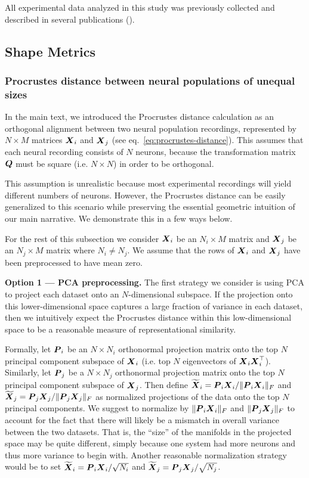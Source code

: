 
All experimental data analyzed in this study was previously collected and described in several publications (\cite{duszkiewicz,Siegle2021-hs, Siegel2015-cz, iblreproducibility}).

\subsection{Shape Metrics}

\subsubsection{Procrustes distance between neural populations of unequal sizes}

In the main text, we introduced the Procrustes distance calculation as an orthogonal alignment between two neural population recordings, represented by $N \times M$ matrices $\boldsymbol{X}_i$ and $\boldsymbol{X}_j$ (see eq.~\ref{eq:procrustes-distance}).
This assumes that each neural recording consists of $N$ neurons, because the transformation matrix $\boldsymbol{Q}$ must be square (i.e. $N \times N$) in order to be orthogonal.

This assumption is unrealistic because most experimental recordings will yield different numbers of neurons.
However, the Procrustes distance can be easily generalized to this scenario while preserving the essential geometric intuition of our main narrative.
We demonstrate this in a few ways below.

For the rest of this subsection we consider $\boldsymbol{X}_i$ be an $N_i \times M$ matrix and $\boldsymbol{X}_j$ be an $N_j \times M$ matrix where $N_i \neq N_j$.
We assume that the rows of $\boldsymbol{X}_i$ and $\boldsymbol{X}_j$ have been preprocessed to have mean zero.

\textbf{Option 1 --- PCA preprocessing.}
The first strategy we consider is using PCA to project each dataset onto an $N$-dimensional subspace.
If the projection onto this lower-dimensional space captures a large fraction of variance in each dataset, then we intuitively expect the Procrustes distance within this low-dimensional space to be a reasonable measure of representational similarity.

Formally, let $\boldsymbol{P}_i$ be an $N \times N_i$ orthonormal projection matrix onto the top $N$ principal component subspace of $\boldsymbol{X}_i$ (i.e. top $N$ eigenvectors of $\boldsymbol{X}_i \boldsymbol{X}_i^\top$).
Similarly, let $\boldsymbol{P}_j$ be a $N \times N_j$ orthonormal projection matrix onto the top $N$ principal component subspace of $\boldsymbol{X}_j$.
Then define $\widetilde{\boldsymbol{X}}_i = \boldsymbol{P}_i \boldsymbol{X}_i / \Vert \boldsymbol{P}_i \boldsymbol{X}_i \Vert_F$ and $\widetilde{\boldsymbol{X}}_j = \boldsymbol{P}_j \boldsymbol{X}_j / \Vert \boldsymbol{P}_j \boldsymbol{X}_j \Vert_F$ as normalized projections of the data onto the top $N$ principal components.
We suggest to normalize by $\Vert \boldsymbol{P}_i \boldsymbol{X}_i \Vert_F$ and $\Vert \boldsymbol{P}_j \boldsymbol{X}_j \Vert_F$ to account for the fact that there will likely be a mismatch in overall variance between the two datasets.
That is, the ``size'' of the manifolds in the projected space may be quite different, simply because one system had more neurons and thus more variance to begin with.
Another reasonable normalization strategy would be to set $\widetilde{\boldsymbol{X}}_i = \boldsymbol{P}_i \boldsymbol{X}_i / \sqrt{N_i}$ and $\widetilde{\boldsymbol{X}}_j = \boldsymbol{P}_j \boldsymbol{X}_j / \sqrt{N_j}$.

